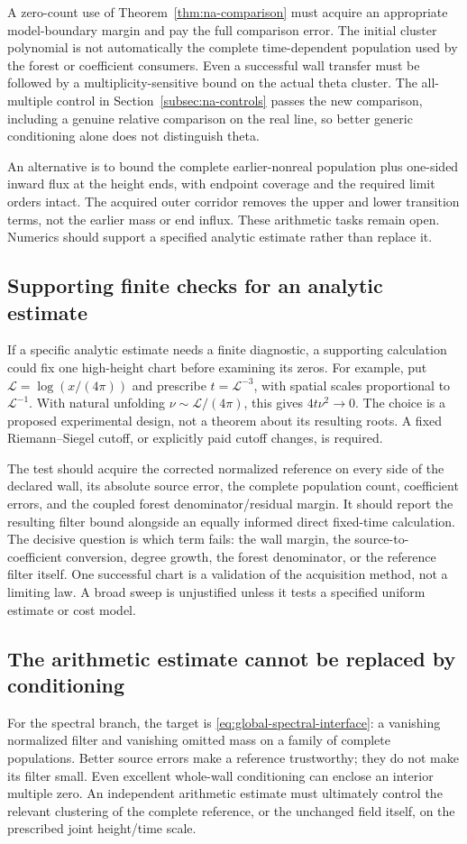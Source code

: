 A zero-count use of Theorem~\ref{thm:na-comparison} must acquire an
appropriate model-boundary margin and pay the full comparison error.
The initial cluster polynomial is not automatically the complete
time-dependent population used by the forest or coefficient consumers.
Even a successful wall transfer must be followed by a
multiplicity-sensitive bound on the actual theta cluster.
The all-multiple control in Section~\ref{subsec:na-controls} passes the
new comparison, including a genuine relative comparison on the real
line, so better generic conditioning alone does not distinguish theta.

An alternative is to bound the complete earlier-nonreal population plus
one-sided inward flux at the height ends, with endpoint coverage and
the required limit orders intact. The acquired outer corridor removes
the upper and lower transition terms, not the earlier mass or end influx.
These arithmetic tasks remain open. Numerics should support a specified
analytic estimate rather than replace it.

\subsection{Supporting finite checks for an analytic estimate}
If a specific analytic estimate needs a finite diagnostic, a supporting
calculation could fix one high-height chart before examining its zeros. For example, put \(\mathcal L=\log(x/(4\pi))\) and prescribe
\(t=\mathcal L^{-3}\), with spatial scales proportional to
\(\mathcal L^{-1}\). With natural unfolding
\(\nu\sim\mathcal L/(4\pi)\), this gives \(4t\nu^2\to0\).
The choice is a proposed experimental design, not a theorem about its
resulting roots. A fixed Riemann--Siegel cutoff, or explicitly paid cutoff
changes, is required.

The test should acquire the corrected normalized reference on every side of
the declared wall, its absolute source error, the complete population count,
coefficient errors, and the coupled forest denominator/residual margin.
It should report the resulting filter bound alongside an equally informed
direct fixed-time calculation. The decisive question is which term fails:
the wall margin, the source-to-coefficient conversion, degree growth, the
forest denominator, or the reference filter itself. One successful chart is
a validation of the acquisition method, not a limiting law. A broad sweep is
unjustified unless it tests a specified uniform estimate or cost model.

\subsection{The arithmetic estimate cannot be replaced by conditioning}
For the spectral branch, the target is \eqref{eq:global-spectral-interface}: a vanishing
normalized filter and vanishing omitted mass on a family of complete
populations. Better source errors make a reference trustworthy; they do not
make its filter small. Even excellent whole-wall conditioning can enclose an
interior multiple zero. An independent arithmetic estimate must ultimately
control the relevant clustering of the complete reference, or the unchanged
field itself, on the prescribed joint height/time scale.

